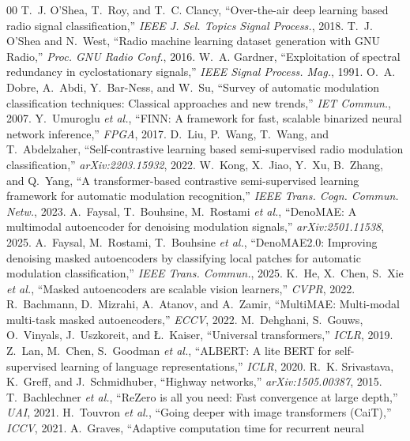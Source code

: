 \documentclass[conference]{IEEEtran}
\begin{document}
\begin{thebibliography}{00}
 T.~J. O'Shea, T.~Roy, and T.~C. Clancy, ``Over-the-air deep
learning based radio signal classification,'' \emph{IEEE J. Sel. Topics Signal
Process.}, 2018.
 T.~J. O'Shea and N.~West, ``Radio machine learning dataset
generation with GNU Radio,'' \emph{Proc. GNU Radio Conf.}, 2016.
 W.~A. Gardner, ``Exploitation of spectral redundancy in
cyclostationary signals,'' \emph{IEEE Signal Process. Mag.}, 1991.
 O.~A. Dobre, A.~Abdi, Y.~Bar-Ness, and W.~Su, ``Survey of automatic
modulation classification techniques: Classical approaches and new trends,''
\emph{IET Commun.}, 2007.
 Y.~Umuroglu \emph{et al.}, ``FINN: A framework for fast, scalable
binarized neural network inference,'' \emph{FPGA}, 2017.
 D.~Liu, P.~Wang, T.~Wang, and T.~Abdelzaher,
``Self-contrastive learning based semi-supervised radio modulation classification,''
\emph{arXiv:2203.15932}, 2022.
 W.~Kong, X.~Jiao, Y.~Xu, B.~Zhang, and Q.~Yang, ``A transformer-based
contrastive semi-supervised learning framework for automatic modulation
recognition,'' \emph{IEEE Trans. Cogn. Commun. Netw.}, 2023.
 A.~Faysal, T.~Bouhsine, M.~Rostami \emph{et al.}, ``DenoMAE: A
multimodal autoencoder for denoising modulation signals,'' \emph{arXiv:2501.11538},
2025.
 A.~Faysal, M.~Rostami, T.~Bouhsine \emph{et al.}, ``DenoMAE2.0:
Improving denoising masked autoencoders by classifying local patches for automatic
modulation classification,'' \emph{IEEE Trans. Commun.}, 2025.
 K.~He, X.~Chen, S.~Xie \emph{et al.}, ``Masked autoencoders are
scalable vision learners,'' \emph{CVPR}, 2022.
 R.~Bachmann, D.~Mizrahi, A.~Atanov, and A.~Zamir, ``MultiMAE:
Multi-modal multi-task masked autoencoders,'' \emph{ECCV}, 2022.
 M.~Dehghani, S.~Gouws, O.~Vinyals, J.~Uszkoreit, and \L.~Kaiser,
``Universal transformers,'' \emph{ICLR}, 2019.
 Z.~Lan, M.~Chen, S.~Goodman \emph{et al.}, ``ALBERT: A lite BERT
for self-supervised learning of language representations,'' \emph{ICLR}, 2020.
 R.~K. Srivastava, K.~Greff, and J.~Schmidhuber, ``Highway
networks,'' \emph{arXiv:1505.00387}, 2015.
 T.~Bachlechner \emph{et al.}, ``ReZero is all you need: Fast
convergence at large depth,'' \emph{UAI}, 2021.
 H.~Touvron \emph{et al.}, ``Going deeper with image
transformers (CaiT),'' \emph{ICCV}, 2021.
 A.~Graves, ``Adaptive computation time for recurrent neural

\end{thebibliography}
\end{document}
